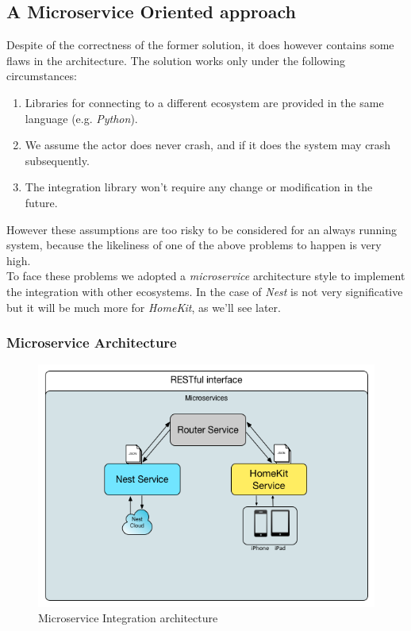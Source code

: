 \subsection{A Microservice Oriented approach}

Despite of the correctness of the former solution, it does however contains some
flaws in the architecture. The solution works only under the following circumstances:

\begin{enumerate}
    \item Libraries for connecting to a different ecosystem are provided in the same language (e.g. \textit{Python}).
    \item We assume the actor does never crash, and if it does the system may crash subsequently.
    \item The integration library won't require any change or modification in the future.
\end{enumerate}

However these assumptions are too risky to be considered for an always running system, because the likeliness
of one of the above problems to happen is very high.\\
To face these problems we adopted a \textit{microservice} architecture style to implement the integration with
other ecosystems. In the case of \textit{Nest} is not very significative but it will be much more for \textit{HomeKit}, as
we'll see later.

\subsubsection{Microservice Architecture}


\begin{figure}[h]
\caption{Microservice Integration architecture}
\label{fig:test-arch}
\centering
\includegraphics[scale=0.65]{test-arch.png}
\end{figure}

